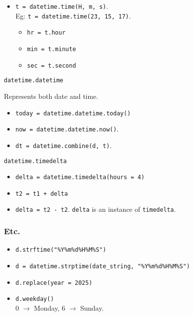 \begin{itemize}
\item \texttt{t = datetime.time(H, m, s)}.\\
    Eg: \texttt{t = datetime.time(23, 15, 17)}.\\
    \begin{itemize}
    \item \texttt{hr = t.hour}\\
    \item \texttt{min = t.minute}\\
    \item \texttt{sec = t.second}\\
    \end{itemize}
\end{itemize}

\begin{center}
    \large{\texttt{datetime.datetime}}
\end{center}

Represents both date and time.

\begin{itemize}
    \item \texttt{today = datetime.datetime.today()}
    \item \texttt{now = datetime.datetime.now()}.
    \item \texttt{dt = datetime.combine(d, t)}.
\end{itemize}


\begin{center}
    \large{\texttt{datetime.timedelta}}
\end{center}

\begin{itemize}
\item \texttt{delta = datetime.timedelta(hours = 4)}
\item \texttt{t2 = t1 + delta}
\item \texttt{delta = t2 - t2}. \texttt{delta} is an instance of \texttt{timedelta}.\\
\end{itemize}

\subsubsection{Etc.}

\begin{itemize}
\item \texttt{d.strftime("\%Y\%m\%d\%H\%M\%S")}
\item \texttt{d = datetime.strptime(date\_string, "\%Y\%m\%d\%H\%M\%S")}
\item \texttt{d.replace(year = 2025)}
\item \texttt{d.weekday()}\\
        0 $\to$ Monday, 6 $\to$ Sunday.\\
\end{itemize}  

